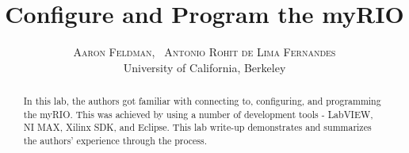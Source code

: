 \documentclass[twoside]{article}
\title{\vspace{-15mm}\fontsize{24pt}{10pt}\selectfont\textbf{Configure and Program the myRIO}} %
\author{
\large
\textsc{Aaron Feldman, \ Antonio Rohit de Lima Fernandes}\\[2mm] %
\normalsize University of California, Berkeley \\ %
\normalsize 
\vspace{-5mm}
}
\begin{document}
\maketitle %

\thispagestyle{fancy} %


\begin{abstract}

\noindent In this lab, the authors got familiar with connecting to, configuring, and programming the myRIO. This was achieved by using a number of development tools - LabVIEW, NI MAX, Xilinx SDK, and Eclipse. This lab write-up demonstrates and summarizes the authors' experience through the process.
\end{abstract}

\end{document}
